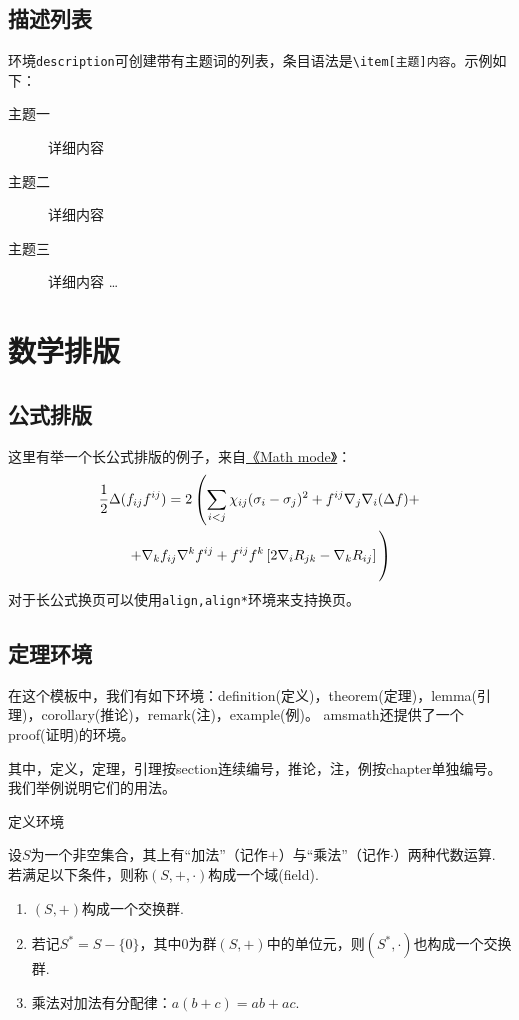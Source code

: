 \subsection{描述列表}
环境\verb+description+可创建带有主题词的列表，条目语法是\verb+\item[主题]内容+。示例如下：

\begin{description}
	\item[主题一] 详细内容
	\item[主题二] 详细内容
	\item[主题三] 详细内容 \ldots
\end{description}

\section{数学排版}

\subsection{公式排版}

这里有举一个长公式排版的例子，来自\href{http://www.tex.ac.uk/tex-archive/info/math/voss/mathmode/Mathmode.pdf}{《Math mode》}：
\begin{multline}
\frac {1}{2}\Delta (f_{ij}f^{ij})=
2\left (\sum _{i<j}\chi _{ij}(\sigma _{i}-
\sigma _{j}) ^{2}+ f^{ij}\nabla _{j}\nabla _{i}(\Delta f)+\right .\\
\left .+\nabla _{k}f_{ij}\nabla ^{k}f^{ij}+
f^{ij}f^{k}\left [2\nabla _{i}R_{jk}-
\nabla _{k}R_{ij}\right ]\vphantom {\sum _{i<j}}\right )
\end{multline}
对于长公式换页可以使用\verb|align,align*|环境来支持换页。
\subsection{定理环境}

在这个模板中，我们有如下环境：definition(定义)，theorem(定理)，lemma(引理)，corollary(推论)，remark(注)，example(例)。
amsmath还提供了一个proof(证明)的环境。

其中，定义，定理，引理按section连续编号，推论，注，例按chapter单独编号。
我们举例说明它们的用法。

定义环境
\begin{definition}[域]\label{def:field}
	设$S$为一个非空集合，其上有“加法”（记作$+$）与“乘法”（记作$\cdot$）两种代数运算. 若满足以下条件，则称$(S,+,\cdot)$构成一个域(field).
	\begin{enumerate}[label={\rm{\roman*)}}]
		\item $(S,+)$构成一个交换群.
		\item 若记$S^{*}=S-\{0\}$，其中$0$为群$(S,+)$中的单位元，则$(S^{*},\cdot)$也构成一个交换群.
		\item 乘法对加法有分配律：$a ( b + c ) = a b + a c$.
	\end{enumerate}
\end{definition}

